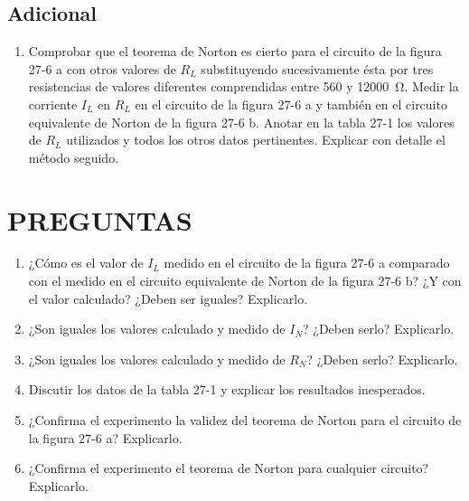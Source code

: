 \subsection*{Adicional}
\begin{enumerate}[resume, label=\arabic*.]
    \item Comprobar que el teorema de Norton es cierto para el circuito de la figura 27-6 a con otros valores de $R_L$ substituyendo sucesivamente ésta por tres resistencias de valores diferentes comprendidas entre 560 y \SI{12000}{\ohm}. Medir la corriente $I_L$ en $R_L$ en el circuito de la figura 27-6 a y también en el circuito equivalente de Norton de la figura 27-6 b. Anotar en la tabla 27-1 los valores de $R_L$ utilizados y todos los otros datos pertinentes. Explicar con detalle el método seguido.
\end{enumerate}

\section*{PREGUNTAS}
\begin{enumerate}[label=\arabic*.]
    \item ¿Cómo es el valor de $I_L$ medido en el circuito de la figura 27-6 a comparado con el medido en el circuito equivalente de Norton de la figura 27-6 b? ¿Y con el valor calculado? ¿Deben ser iguales? Explicarlo.

    \item ¿Son iguales los valores calculado y medido de $I_N$? ¿Deben serlo? Explicarlo.

    \item ¿Son iguales los valores calculado y medido de $R_N$? ¿Deben serlo? Explicarlo.

    \item Discutir los datos de la tabla 27-1 y explicar los resultados inesperados.

    \item ¿Confirma el experimento la validez del teorema de Norton para el circuito de la figura 27-6 a? Explicarlo.

    \item ¿Confirma el experimento el teorema de Norton para cualquier circuito? Explicarlo.
\end{enumerate}